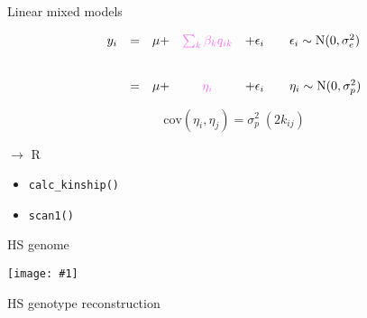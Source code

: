 \documentclass[12pt]{article}
\newcommand{\headsize}{\fontsize{35}{35} \selectfont}
\newcommand{\textsize}{\fontsize{30}{35} \selectfont}
\newcommand{\smallsize}{\fontsize{25}{30} \selectfont}
\newcommand{\figh}[2]{\centerline{\texttt{[image: \#1]}}}
\begin{document}
\newpage

\headsize \color{myyellow}
\hfill\begin{minipage}{5.75in}
\centering
Linear mixed models
\end{minipage}


\vspace{3cm}

\color{mywhite} \textsize

$$\begin{array}{lllcl@{\qquad}l}
  y_i & = & \mu + & \textstyle{{\color{mypink} \sum_k \beta_k q_{ik}}} & + \epsilon_i
               & \epsilon_i \sim \text{N}(0, \sigma^2_e) \\[24pt]
  & = & \mu + & {\color{mypink} \eta_i} & + \epsilon_i & \eta_i \sim \text{N}(0, \sigma^2_p)
\end{array}$$

\vspace{2cm}

$$\text{cov}(\eta_i, \eta_j) = \sigma^2_p \; (2 k_{ij})$$



\newpage

\headsize \color{myyellow}
$\boldsymbol{\rightarrow}$ R

\vspace{3cm}

\color{mywhite} \smallsize

\hfill \begin{minipage}[t]{9.5in}
\begin{itemize}
\itemsep24pt
\item \verb|calc_kinship()|
\item \verb|scan1()|
\end{itemize} \end{minipage}





\newpage

\headsize \color{myyellow}
\hfill\begin{minipage}{5.75in}
\centering
HS genome
\end{minipage}

\vspace{5mm}

\figh{Figs/do_genome.pdf}{0.9}


\newpage

\headsize \color{myyellow}
\hfill\begin{minipage}{6.75in}
\centering
HS genotype reconstruction
\end{minipage}
\end{document}

